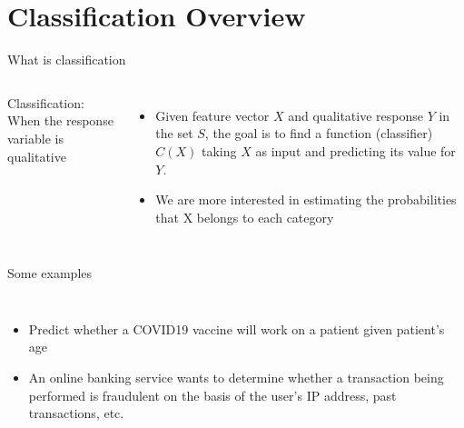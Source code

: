 \documentclass[aspectratio=169,usenames,dvipsnames]{beamer}
\newcommand{\InstructorNotes}[1]{\textit{\color{orange}#1}}
\newcommand{\InstructorList}[1]{
\begin{itemize}
	\color{orange}
	#1
\end{itemize}
}
\renewcommand{\InstructorNotes}[1]{} \renewcommand{\InstructorList}[1]{}
\begin{document}
\section{Classification Overview}

\begin{frame}[t]{What is classification }

\begin{columns}
Classification: When the response variable is qualitative

\InstructorList{
\item qualitative: Unordered set
\item Examples
\InstructorList{
\item Eye color $\in \{ brown, blue, green\}$
\item $email \in \{ spam, not spam\}$
}
}
\begin{itemize}
	\item
Given feature vector $X$ and qualitative response $Y$ in the set $S$, the goal is to find a function (classifier) $C(X)$ taking $X$ as input and predicting its value for $Y$.

	\item
We are more interested in estimating the probabilities that X belongs to each category
\end{itemize}
\end{columns}

\end{frame}
\begin{frame}[c]{Some examples }

\InstructorNotes{Discuss what set $Y$ comes from in each case }

\begin{columns}
\centering
\begin{itemize}
	\item Predict whether a COVID19 vaccine will work on a patient given patient's age
	\item An online banking service wants to determine whether a transaction being performed is fraudulent on the basis of the user's IP address, past transactions, etc.

\end{itemize}
\centering

\end{columns}

\end{frame}
\end{document}
